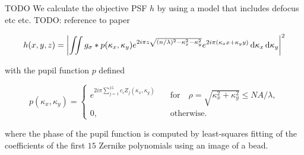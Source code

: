 \documentclass[a0paper,portrait,fontscale=0.35]{baposter}
\theoremstyle{plain}
\theoremstyle{plain}
\theoremstyle{definition}
\theoremstyle{plain}
\theoremstyle{definition}
\begin{document}
\begin{poster}
{  \begin{minipage}[t]{\textwidth}
    TODO
    We calculate the objective PSF $h$ by using a model 
    that includes defocus etc etc. TODO: reference to paper 
    \begin{tcolorbox}[colback=teal!10!white,colframe=white]
      \begin{equation}
        h(x,y,z) = \left|
          \iint g_{\sigma} * p(\kappa_x,\kappa_y) e^{
            2 i \pi z 
            \sqrt{(n/\lambda)^2 - \kappa_x^2 - \kappa_y^2}
          }
          e^{
            2 i \pi (\kappa_x x + \kappa_y y)
          }
          \dif \kappa_x \dif \kappa_y
        \right|^2
        \label{eq:psf model}
      \end{equation}
    \end{tcolorbox}
    with the pupil function $p$ defined 
    \begin{tcolorbox}[colback=teal!10!white,colframe=white]
      \begin{equation}
        p(\kappa_x,\kappa_y) = \begin{cases}
          e^{2i\pi \sum_{j=1}^{15} c_i Z_j(\kappa_x,\kappa_y)}
          \quad
            &\text{for} \quad
            \rho = \sqrt{\kappa_x^2 + \kappa_y^2} \leq NA/\lambda,\\
            0, \quad &\text{otherwise.}
        \end{cases}
      \end{equation}
    \end{tcolorbox}
    where the phase of the pupil function is computed by least-squares
    fitting of the coefficients of the first $15$ Zernike polynomials
    using an image of a bead.
  \end{minipage}

}
\end{poster}
\end{document}
